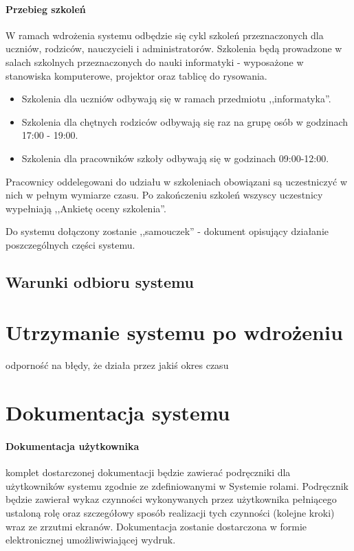 \documentclass{article}
\begin{document}
\paragraph{Przebieg szkoleń}
W ramach wdrożenia systemu odbędzie się cykl szkoleń przeznaczonych dla uczniów, rodziców, nauczycieli i administratorów. Szkolenia będą prowadzone w salach szkolnych przeznaczonych do nauki informatyki - wyposażone w stanowiska komputerowe, projektor oraz tablicę do rysowania.
\begin{itemize}
\item Szkolenia dla uczniów odbywają się w ramach przedmiotu ,,informatyka''.
\item Szkolenia dla chętnych rodziców odbywają się raz na grupę osób w godzinach 17:00 - 19:00.
\item Szkolenia dla pracowników szkoły odbywają się w godzinach 09:00-12:00.
\end{itemize}
Pracownicy oddelegowani do udziału w szkoleniach obowiązani są uczestniczyć w nich w pełnym wymiarze czasu. Po zakończeniu szkoleń wszyscy uczestnicy wypełniają ,,Ankietę oceny szkolenia''.

Do systemu dołączony zostanie ,,samouczek'' - dokument opisujący działanie poszczególnych części systemu.

\subsection{Warunki odbioru systemu}
\section{Utrzymanie systemu po wdrożeniu}
odporność na błędy, że działa przez jakiś okres czasu

\section{Dokumentacja systemu}
\paragraph{Dokumentacja użytkownika} komplet dostarczonej dokumentacji będzie zawierać podręczniki dla użytkowników systemu zgodnie ze zdefiniowanymi w Systemie rolami. Podręcznik będzie zawierał wykaz czynności wykonywanych przez użytkownika pełniącego ustaloną rolę oraz szczegółowy sposób realizacji tych czynności (kolejne kroki) wraz ze zrzutmi ekranów. Dokumentacja zostanie dostarczona w formie elektronicznej umożliwiwiającej wydruk.
\end{document}
